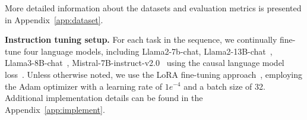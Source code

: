More detailed information about the datasets and evaluation metrics is presented in Appendix~\ref{app:dataset}. 


\textbf{Instruction tuning setup.} For each task in the sequence, we continually fine-tune four language models, including Llama2-7b-chat, Llama2-13B-chat~\citep{touvron2023llama}, Llama3-8B-chat~\citep{dubey2024llama}, Mistral-7B-instruct-v2.0~\citep{jiang2023mistral} using the causal language model loss~\citep{radford2019language}. %
Unless otherwise noted, we use the LoRA fine-tuning approach~\citep{hu2021lora}, employing the Adam optimizer with a learning rate of $1e^{-4}$ and a batch size  of 32. Additional implementation details can be found in the Appendix~\ref{app:implement}.


